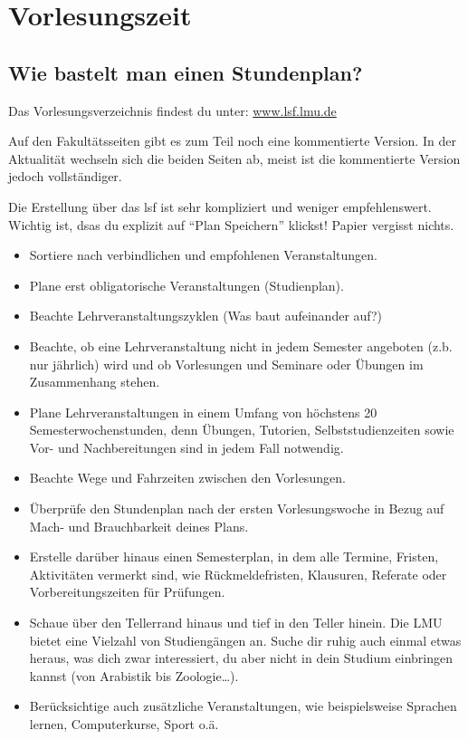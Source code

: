 ﻿
\section{Vorlesungszeit}

\subsection{Wie bastelt man einen Stundenplan?}

Das Vorlesungsverzeichnis findest du unter: \url{www.lsf.lmu.de}

Auf den Fakultätsseiten gibt es zum Teil noch eine kommentierte
Version. In der Aktualität wechseln sich die beiden Seiten ab, meist
ist die kommentierte Version jedoch vollständiger.

Die Erstellung über das lsf ist sehr kompliziert und weniger
empfehlenswert.  Wichtig ist, dsas du explizit auf ``Plan Speichern''
klickst!  Papier vergisst nichts.

\begin{itemize}
	\item Sortiere nach verbindlichen und empfohlenen Veranstaltungen.
	\item Plane erst obligatorische Veranstaltungen (Studienplan).
	\item Beachte Lehrveranstaltungszyklen (Was baut aufeinander auf?)
	\item Beachte, ob eine Lehrveranstaltung nicht in jedem
          Semester angeboten (z.b. nur jährlich) wird und ob
          Vorlesungen und Seminare oder Übungen im Zusammenhang
          stehen.
	\item Plane Lehrveranstaltungen in einem Umfang von höchstens 20 Semesterwochenstunden, denn Übungen, Tutorien, Selbststudienzeiten sowie Vor- und Nachbereitungen sind in jedem Fall notwendig.
	\item Beachte Wege und Fahrzeiten zwischen den Vorlesungen.
	\item Überprüfe den Stundenplan nach der ersten Vorlesungswoche in Bezug auf Mach- und Brauchbarkeit deines Plans.
	\item Erstelle darüber hinaus einen Semesterplan, in dem alle Termine, Fristen, Aktivitäten vermerkt sind, wie Rückmeldefristen, Klausuren, Referate oder Vorbereitungszeiten für Prüfungen.
	\item Schaue über den Tellerrand hinaus und tief in den Teller hinein. Die LMU bietet eine Vielzahl von Studiengängen an. Suche dir ruhig auch einmal etwas heraus, was dich zwar interessiert, du aber nicht in dein Studium einbringen kannst (von Arabistik bis Zoologie\ldots).
	\item Berücksichtige auch zusätzliche Veranstaltungen, wie beispielsweise Sprachen lernen, Computerkurse, Sport o.ä.
\end{itemize}



